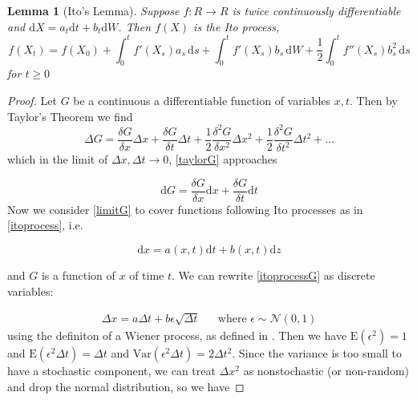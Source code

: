 \documentclass[11pt]{article} %
\newtheorem{lemma}[theorem]{Lemma}
\begin{document}
\begin{lemma}[Ito's Lemma] 
    \label{itolemma}
    Suppose $f: R \to R$ is twice continuously differentiable and 
    $\mathrm{d}X = a_t\mathrm{d}t + b_t\mathrm{d}W$. Then $f(X)$ is the Ito process,
    \begin{equation}
        f(X_t)
        = f(X_0) + \int_0^t \! f'(X_s)a_s \, \mathrm{d}s + 
        \int_0^t \! f'(X_s)b_s \, \mathrm{d}W + \frac{1}{2}\int_0^t \! f''(X_s)b_s^2 \,
         \mathrm{d}s
    \end{equation}
    for $t\ge0$
\end{lemma}
\begin{proof}
    Let $G$ be a continuous a differentiable function of variables $x, t$. 
    Then by Taylor's Theorem we find
    \begin{equation}\label{taylorG}
        \Delta G = \frac{\delta G}{\delta x}\Delta x + 
        \frac{\delta G}{\delta t}\Delta t + 
        \frac{1}{2} \frac{\delta^2 G}{\delta x^2}\Delta x^2 + 
        \frac{1}{2} \frac{\delta^2 G}{\delta t^2}\Delta t^2 + \dots
    \end{equation}
    which in the limit of $\Delta x, \Delta t \to 0$, \ref{taylorG} approaches

    \begin{equation}\label{limitG}
        \mathrm{d}G = \frac{\delta G}{\delta x}\mathrm{d}x + 
        \frac{\delta G}{\delta t}\mathrm{d}t
    \end{equation}
    Now we consider \ref{limitG} to cover functions following Ito processes as 
    in \ref{itoprocess}, i.e.

    \begin{equation}\label{itoprocessG}
        \mathrm{d}x = a(x,t)\mathrm{d}t + b(x,t)\mathrm{d}z
    \end{equation}

    and $G$ is a function of $x$ of time $t$. We can rewrite \ref{itoprocessG} 
    as discrete variables:

    \begin{align}
        \Delta x = a\Delta t + b \epsilon \sqrt{\Delta t}
         && \text{where $\epsilon \sim \mathcal{N}(0,1)$}
    \end{align}
using the definiton of a Wiener process, as defined in \cite{optionsderivatives}. 
Then we have $\mathrm{E}(\epsilon^2) = 1$  and $\mathrm{E}(\epsilon^2  \Delta t) =
 \Delta t$ and $\mathrm{Var}(\epsilon^2  \Delta t) = 2\Delta t ^2$. Since the variance 
 is too small to have a stochastic component, we can treat $\Delta x ^2$ as nonstochastic 
(or non-random) and drop the normal distribution, so we have 


\end{proof}
\end{document}
